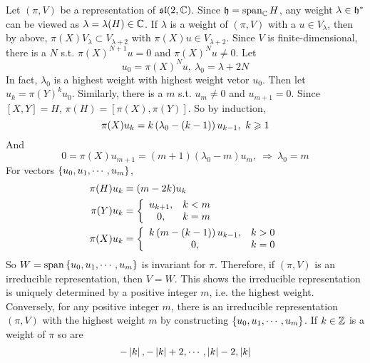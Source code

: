 \documentclass[a4paper,12pt]{article}
\begin{document}
	\begin{exam}
		Let $(\pi,V)$ be a representation of $\mathfrak{sl}(2,\mathbb{C})$. Since $\mathfrak{h} = \operatorname{span}_{\mathbb{C}}H$, any weight $\lambda \in \mathfrak{h}^*$ can be viewed as $\lambda = \lambda(H) \in \mathbb{C}$. If $\lambda$ is a weight of $(\pi,V)$ with a $u \in V_{\lambda}$, then by above, $\pi(X)V_{\lambda} \subset V_{\lambda+2}$ with $\pi(X)u \in V_{\lambda+2}$. Since $V$ is finite-dimensional, there is a $N$ s.t. $\pi(X)^{N+1}u = 0$ and $\pi(X)^{N}u \neq 0$. Let
		\begin{equation*}
		 	u_0 = \pi(X)^{N}u,~\lambda_0 = \lambda + 2N
		\end{equation*} 
		In fact, $\lambda_0$ is a highest weight with highest weight vetor $u_0$. Then let $u_k = \pi(Y)^{k}u_0$. Similarly, there is a $m$ s.t. $u_m \neq 0$ and $u_{m+1} = 0$. Since $[X,Y] = H$, $\pi(H) = [\pi(X),\pi(Y)]$. So by induction,
		\begin{equation*}
			\pi(X)u_{k} = k\left(\lambda_0 - (k-1)\right)u_{k-1},~k \geqslant 1
		\end{equation*}
		And 
		\begin{equation*}
			0 = \pi(X)u_{m+1} = (m+1)(\lambda_0-m)u_m,~\Rightarrow~ \lambda_0 = m
		\end{equation*}
		For vectors $\left\{u_0,u_1,\cdots,u_m\right\}$,
		\begin{equation*}
			\begin{split}
				\pi(H)u_k &= (m-2k)u_k \\
				\pi(Y)u_k &= \left\{
					\begin{array}{cc}
						u_{k+1},& k< m \\
						0,& k = m
					\end{array}
				\right. \\
				\pi(X)u_k &= \left\{
					\begin{array}{cc}
						k\left(m - (k-1)\right)u_{k-1},& k>0 \\
						0,& k = 0
					\end{array}
				\right.
			\end{split}
		\end{equation*}
		So $W = \operatorname{span}\left\{u_0,u_1,\cdots,u_m\right\}$ is invariant for $\pi$. Therefore, if $(\pi,V)$ is an irreducible representation, then $V = W$. This shows the irreducible representation is uniquely determined by a positive integer $m$, i.e. the highest weight. Conversely, for any positive integer $m$, there is an irreducible representation $(\pi,V)$ with the highest weight $m$ by constructing $\left\{u_0,u_1,\cdots,u_m\right\}$. If $k \in \mathbb{Z}$ is a weight of $\pi$ so are
		\begin{equation*}
			-\left\lvert k\right\lvert,-\left\lvert k\right\lvert+2,\cdots,\left\lvert k\right\lvert-2,\left\lvert k\right\lvert
		\end{equation*}
	\end{exam}
\end{document}
